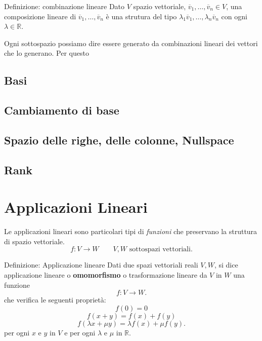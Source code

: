 \documentclass[x11names]{article}
\begin{document}
\begin{center}
\colorbox{myblue}{\begin{minipage}{5.75in}
\begin{blues}{Definizione: combinazione lineare}
Dato $V$ spazio vettoriale, $\overline{v}_{1},\dots,\overline{v}_{n} \in V$, una composizione lineare di $\overline{v}_{1},\dots,\overline{v}_{n}$ è una strutura del tipo $\lambda_{1}\overline{v}_{1},\dots,\lambda_{n}\overline{v}_{n}$ con ogni $\lambda \in \mathbb{R}$.
\end{blues}
\end{minipage}}        
\end{center}
Ogni sottospazio possiamo dire essere generato da combinazioni lineari dei vettori che lo generano. Per questo 

\subsection{Basi}
\subsection{Cambiamento di base}
\subsection{Spazio delle righe, delle colonne, Nullspace}
\subsection{Rank}





\newpage
\section{Applicazioni Lineari}
Le applicazioni lineari sono particolari tipi di \textit{funzioni} che preservano la struttura di spazio vettoriale.
\[
f: V \longrightarrow W \qquad V,W \text{ sottospazi vettoriali}
.\] 


\begin{center}
\colorbox{myblue}{\begin{minipage}{5.75in}
\begin{blues}{Definizione: Applicazione lineare}
	Dati due spazi vettoriali reali $V,W$, si dice applicazione lineare o \textbf{omomorfismo} o trasformazione lineare da $V$ in  $W$ una funzione
\[
f: V \longrightarrow W 
.\] 
che verifica le seguenti proprietà:
\[
f\left(0\right) = 0
\] 
\[
f\left(x+y\right) = f\left(x\right) + f\left(y\right)
\] 
\[
f\left(\lambda x + \mu y\right) = \lambda f\left(x\right) + \mu f\left(y\right) 
.\] 
per ogni $x$ e  $y$ in $V$ e per ogni $\lambda$ e $\mu$ in $\mathbb{R}$.
\end{blues}
\end{minipage}}        
\end{center}
\end{document}
